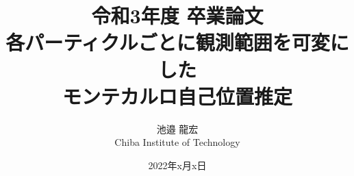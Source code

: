 \documentclass[a4paper,11pt]{jsbook}
\begin{document}
\title{令和3年度 卒業論文\\
各パーティクルごとに観測範囲を可変にした\\モンテカルロ自己位置推定}

\author{池邉 龍宏 \\
Chiba Institute of Technology}

\date{2022年x月x日}

\maketitle



\tableofcontents



\cleardoublepage
{}
 





% 

% 

% 
% 

\newpage
\printindex
\end{document}

